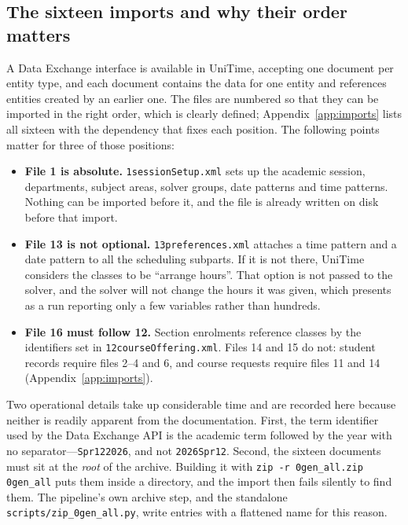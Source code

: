 \subsection{The sixteen imports and why their order matters}

A Data Exchange interface is available in UniTime, accepting one document per entity type, and
each document contains the data for one entity and references entities created by an earlier one.
The files are numbered so that they can be imported in the right order, which is clearly defined;
Appendix~\ref{app:imports} lists all sixteen with the dependency that fixes each position. The
following points matter for three of those positions:

\begin{itemize}
  \item \textbf{File 1 is absolute.} \texttt{1sessionSetup.xml} sets up the academic session,
    departments, subject areas, solver groups, date patterns and time patterns. Nothing can be
    imported before it, and the file is already written on disk before that import.
  \item \textbf{File 13 is not optional.} \texttt{13preferences.xml} attaches a time pattern and a
    date pattern to all the scheduling subparts. If it is not there, UniTime considers the classes
    to be ``arrange hours''. That option is not passed to the solver, and the solver will not
    change the hours it was given, which presents as a run reporting only a few variables rather
    than hundreds.
  \item \textbf{File 16 must follow 12.} Section enrolments reference classes by the
    identifiers set in \texttt{12courseOffering.xml}. Files 14 and 15 do not: student records
    require files 2--4 and 6, and course requests require files 11 and 14
    (Appendix~\ref{app:imports}).
\end{itemize}

Two operational details take up considerable time and are recorded here because neither is readily
apparent from the documentation. First, the term identifier used by the Data Exchange API is the
academic term followed by the year with no separator---\texttt{Spr122026}, and not
\texttt{2026Spr12}. Second, the sixteen documents must sit at the \emph{root} of the archive.
Building it with \texttt{zip -r 0gen\_all.zip 0gen\_all} puts them inside a directory, and the
import then fails silently to find them. The pipeline's own archive step, and the standalone
\texttt{scripts/zip\_0gen\_all.py}, write entries with a flattened name for this reason.

